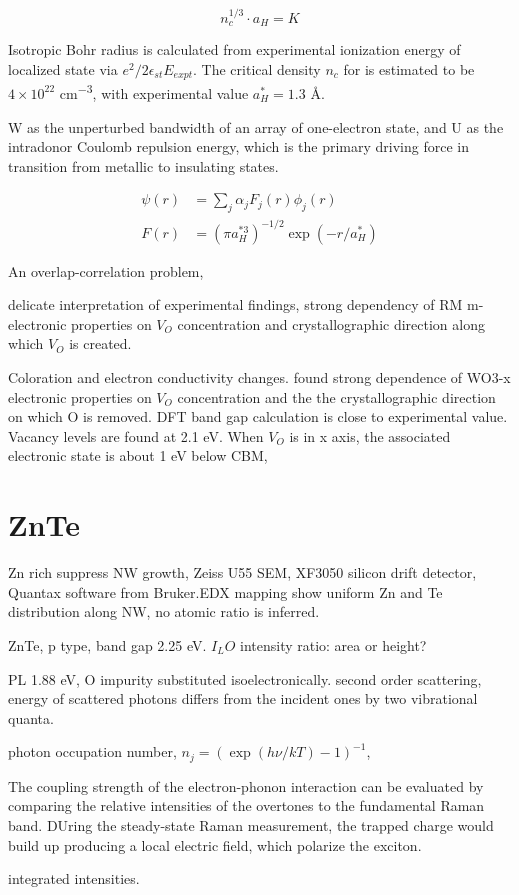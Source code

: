 \[
n_c^{1/3}\cdot a_H = K
\]

Isotropic Bohr radius is calculated from experimental ionization energy of localized state via $e^2/2\epsilon_{st} E_{expt}$.
The critical density $n_c$ for  is estimated to be $4\times 10^{22}$ \si{cm^{-3}}, with experimental value $a_H^* = 1.3$ \si{\angstrom}. 

W as the unperturbed bandwidth of an array of one-electron state, and U as the intradonor Coulomb repulsion energy, which is the primary driving force in transition from metallic to insulating states. 


\begin{align}
\psi(r) &= \sum_j \alpha_j F_j(r)\phi_j(r)\\
F(r) &= (\pi a_H^{*3})^{-1/2} \exp(-r/a_H^*)
\end{align}

An overlap-correlation problem, 

delicate interpretation of experimental findings, strong dependency of RM m- electronic properties on $V_O$ concentration and crystallographic direction along which $V_O$ is created.\cite{Wang2011b} 

Coloration and electron conductivity changes. \citeauthor{Wang2011b} found strong dependence of WO3-x electronic properties on $V_O$ concentration and the the crystallographic direction on which O is removed. DFT band gap calculation is close to experimental value. Vacancy levels are found at 2.1 eV. When $V_O$ is in x axis, the associated electronic state is about 1 eV below CBM, 

\section{ZnTe}

Zn rich suppress NW growth, Zeiss U55 SEM, XF3050 silicon drift detector, Quantax software from Bruker.EDX mapping show uniform Zn and Te distribution along NW, no atomic ratio is inferred. \cite{Rueda-Fonseca2014} 

ZnTe, p type, band gap 2.25 eV. $I_LO$ intensity ratio: area or height? 

PL 1.88 eV, O impurity substituted isoelectronically. second order scattering, energy of scattered photons differs from the incident ones by two vibrational quanta.  \cite{Irwin1970}

photon occupation number, $n_j = (\exp(h\nu/kT) - 1)^{-1}$, 


The coupling strength of the electron-phonon interaction can be evaluated by comparing the relative intensities of the overtones to the fundamental Raman band. DUring the steady-state Raman measurement, the trapped charge would build up producing a local electric field, which polarize the exciton. \cite{Zhang2012}

integrated intensities. 















